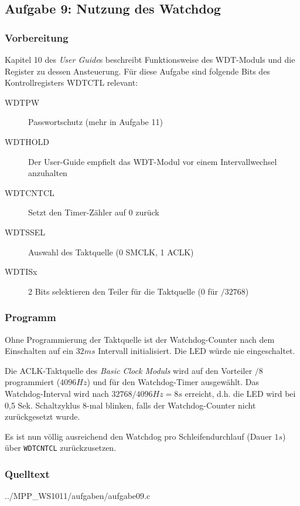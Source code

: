 \subsection*{Aufgabe 9: Nutzung des Watchdog}

\subsubsection*{Vorbereitung}

Kapitel 10 des \emph{User Guide}s beschreibt Funktionsweise des
WDT-Moduls und die Register zu dessen Ansteuerung. Für diese Aufgabe
sind folgende Bits des Kontrollregisters WDTCTL relevant:

\begin{description}
    \item [WDTPW]    Passwortschutz (mehr in Aufgabe 11)
    \item [WDTHOLD]  Der User-Guide empfielt das WDT-Modul vor einem
Intervallwechsel anzuhalten
    \item [WDTCNTCL] Setzt den Timer-Zähler auf
0 zurück \item [WDTSSEL]  Auswahl des Taktquelle (0 SMCLK, 1 ACLK)
    \item [WDTISx]   2 Bits selektieren den Teiler für die Taktquelle (0 für
$/32768$) \end{description}

\subsubsection*{Programm}

Ohne Programmierung der Taktquelle ist der Watchdog-Counter nach dem
Einschalten auf ein $32 ms$ Intervall initialisiert. Die LED würde nie
eingeschaltet.

Die ACLK-Taktquelle des \emph{Basic Clock Moduls} wird auf den Vorteiler
$/8$ programmiert ($4096 Hz$) und für den Watchdog-Timer ausgewählt. Das
Watchdog-Interval wird nach $32768 / 4096 Hz = 8 s$ erreicht, d.h. die
LED wird bei 0,5 Sek. Schaltzyklus 8-mal blinken, falls der
Watchdog-Counter nicht zurückgesetzt wurde.

Es ist nun völlig ausreichend den Watchdog pro Schleifendurchlauf (Dauer
$1 s$) über \texttt{WDTCNTCL} zurückzusetzen.

\subsubsection*{Quelltext}


{../MPP_WS1011/aufgaben/aufgabe09.c}
